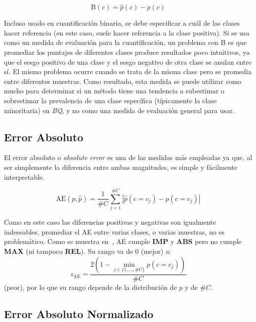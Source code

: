 \begin{equation}
    {\text{B}(c)} = \hat p(c) - p(c)
\end{equation}

Incluso usado en cuantificación binaria, se debe especificar a cuál de las
clases hacer referencia (en este caso, suele hacer referencia a la clase
positiva). Si se usa como un medida de evaluación para la cuantificación, un
problema con B es que promediar los puntajes de diferentes clases produce
resultados poco intuitivos, ya que el sesgo positivo de una clase y el sesgo
negativo de otra clase se anulan entre sí. El mismo problema ocurre cuando se
trata de la misma clase pero se promedia entre diferentes muestras. Como
resultado, esta medida se puede utilizar como mucho para determinar si un método
tiene una tendencia a subestimar o sobrestimar la prevalencia de una clase
específica (típicamente la clase minoritaria) en {\it BQ}, y no como una medida
de evaluación general para usar.

\subsection{Error Absoluto}

El error absoluto o {\it absolute error\/} es una de las medidas más empleadas
ya que, al ser simplemente la diferencia entre ambas magnitudes, es simple y
fácilmente interpretable.

\begin{equation}
    {\text{AE}(p, \hat p)} = \frac{1}{\#C}\sum \limits_{j=1}^{\#C}{|\hat p(c=c_j) - p(c=c_j)|}
\end{equation}

Como en este caso las diferencias positivas y negativas son igualmente
indeseables, promediar el AE entre varias clases, o varias muestras, no es
problemático. Como se muestra en~\cite{sebastiani2020evaluation}, AE cumple {\bf
IMP} y {\bf ABS} pero no cumple {\bf MAX} (ni tampoco {\bf REL}). Su rango va de
0 (mejor) a:
\begin{equation}
    z_{\text{AE}} = \frac{2(1-\displaystyle \min_{j\in\{1,\dots,\#C\}}p(c=c_j))}{\#C}
\end{equation}
(peor), por lo que su rango depende de la distribución de $p$ y de $\#C$.

\subsection{Error Absoluto Normalizado}

